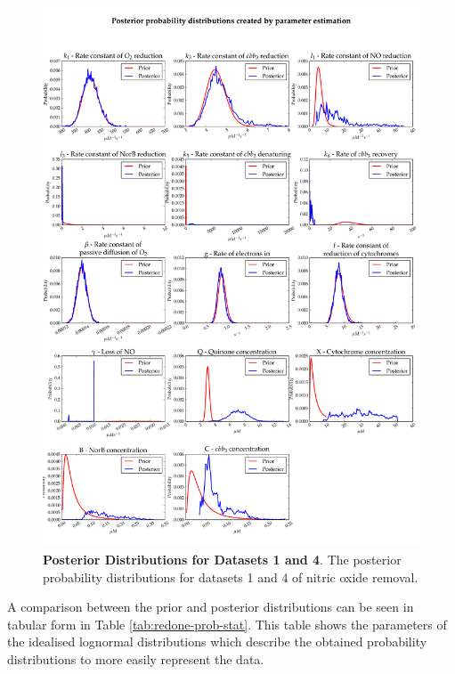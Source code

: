 \begin{figure}[p]
 \centering
 \includegraphics[width=15cm, trim=0cm 0cm 0cm 0cm]{./06-noreduction/data/posteriors-redo2.pdf}
 \caption[Posterior Distributions for Datasets 1 and 4]{{\bf Posterior Distributions for Datasets 1 and 4}. The posterior probability distributions for datasets 1 and 4 of nitric oxide removal.
 \label{fig:redoneposterior2}}
\end{figure}
A comparison between the prior and posterior distributions can be seen in tabular form in Table \ref{tab:redone-prob-stat}. This table shows the parameters of the idealised lognormal distributions which describe the obtained probability distributions to more easily represent the data.

